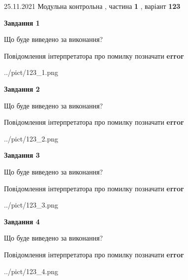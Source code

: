\documentclass[10pt, ukrainian]{article}
\begin{document}
{25.11.2021 Модульна контрольна , частина \textbf { 1 }, варіант  \No \textbf { 123 }\par}
{
\begin {large}

{\begin {center}\textbf{Завдання 1}\end {center}}\par
Що буде виведено за виконання? \par
Повідомлення інтерпретатора про помилку позначати \textbf{error}

\begin{center}
	{../pict/123_1.png}
\end{center}
\newpage

{\begin {center}\textbf{Завдання 2}\end {center}}\par
Що буде виведено за виконання? \par
Повідомлення інтерпретатора про помилку позначати \textbf{error}

\begin{center}
	{../pict/123_2.png}
\end{center}
\newpage

{\begin {center}\textbf{Завдання 3}\end {center}}\par
Що буде виведено за виконання? \par
Повідомлення інтерпретатора про помилку позначати \textbf{error}

\begin{center}
	{../pict/123_3.png}
\end{center}
\newpage

{\begin {center}\textbf{Завдання 4}\end {center}}\par
Що буде виведено за виконання? \par
Повідомлення інтерпретатора про помилку позначати \textbf{error}

\begin{center}
	{../pict/123_4.png}
\end{center}
\newpage


\end{large}}
\end{document}
